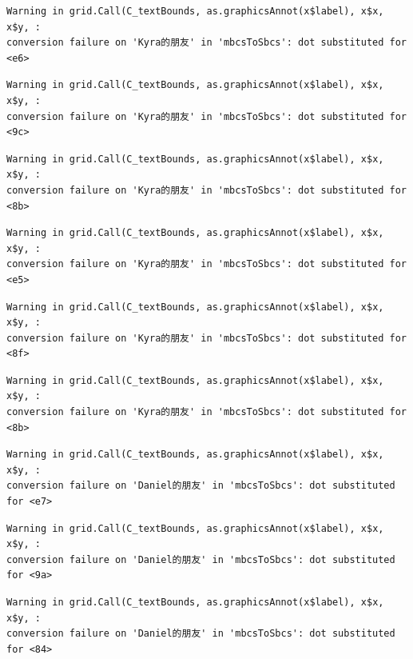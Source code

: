 \documentclass[
  letterpaper,
  DIV=11,
  numbers=noendperiod]{scrreprt}
\begin{document}
\begin{verbatim}
Warning in grid.Call(C_textBounds, as.graphicsAnnot(x$label), x$x, x$y, :
conversion failure on 'Kyra的朋友' in 'mbcsToSbcs': dot substituted for <e6>
\end{verbatim}

\begin{verbatim}
Warning in grid.Call(C_textBounds, as.graphicsAnnot(x$label), x$x, x$y, :
conversion failure on 'Kyra的朋友' in 'mbcsToSbcs': dot substituted for <9c>
\end{verbatim}

\begin{verbatim}
Warning in grid.Call(C_textBounds, as.graphicsAnnot(x$label), x$x, x$y, :
conversion failure on 'Kyra的朋友' in 'mbcsToSbcs': dot substituted for <8b>
\end{verbatim}

\begin{verbatim}
Warning in grid.Call(C_textBounds, as.graphicsAnnot(x$label), x$x, x$y, :
conversion failure on 'Kyra的朋友' in 'mbcsToSbcs': dot substituted for <e5>
\end{verbatim}

\begin{verbatim}
Warning in grid.Call(C_textBounds, as.graphicsAnnot(x$label), x$x, x$y, :
conversion failure on 'Kyra的朋友' in 'mbcsToSbcs': dot substituted for <8f>
\end{verbatim}

\begin{verbatim}
Warning in grid.Call(C_textBounds, as.graphicsAnnot(x$label), x$x, x$y, :
conversion failure on 'Kyra的朋友' in 'mbcsToSbcs': dot substituted for <8b>
\end{verbatim}

\begin{verbatim}
Warning in grid.Call(C_textBounds, as.graphicsAnnot(x$label), x$x, x$y, :
conversion failure on 'Daniel的朋友' in 'mbcsToSbcs': dot substituted for <e7>
\end{verbatim}

\begin{verbatim}
Warning in grid.Call(C_textBounds, as.graphicsAnnot(x$label), x$x, x$y, :
conversion failure on 'Daniel的朋友' in 'mbcsToSbcs': dot substituted for <9a>
\end{verbatim}

\begin{verbatim}
Warning in grid.Call(C_textBounds, as.graphicsAnnot(x$label), x$x, x$y, :
conversion failure on 'Daniel的朋友' in 'mbcsToSbcs': dot substituted for <84>
\end{verbatim}
\end{document}
